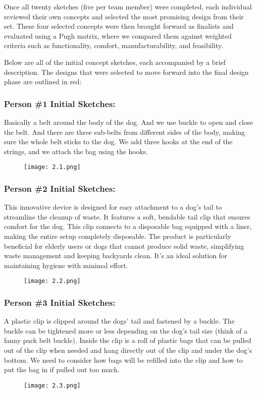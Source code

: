\documentclass[12pt]{article}
\theoremstyle{definition} %
\theoremstyle{plain} %
\begin{document}
Once all twenty sketches (five per team member) were completed, each
individual reviewed their own concepts and selected the most promising design from
their set. These four selected concepts were then brought forward as finalists and
evaluated using a Pugh matrix, where we compared them against weighted criteria
such as functionality, comfort, manufacturability, and feasibility.

Below are all of the initial concept sketches, each accompanied by a brief
description. The designs that were selected to move forward into the final
design phase are outlined in red:
\pagebreak
\subsubsection*{Person \#1 Initial Sketches:}
Basically a belt around the body of the dog. And we
use buckle to open and close the belt. And there are three sub-belts from different
sides of the body, making sure the whole belt sticks to the dog. We add three hooks
at the end of the strings, and we attach the bag using the hooks.
\begin{figure}[htbp]
  \centering
  \texttt{[image: 2.1.png]}
  \caption{}
  \label{fig:}
\end{figure}
\subsubsection*{Person \#2 Initial Sketches:}
This innovative device is designed for easy attachment
to a dog's tail to streamline the cleanup of waste. It features a soft, bendable tail clip
that ensures comfort for the dog. This clip connects to a disposable bag equipped
with a liner, making the entire setup completely disposable. The product is
particularly beneficial for elderly users or dogs that cannot produce solid waste,
simplifying waste management and keeping backyards clean. It's an ideal solution
for maintaining hygiene with minimal effort.
\begin{figure}[htbp]
  \centering
  \texttt{[image: 2.2.png]}
  \caption{}
  \label{fig:}
\end{figure}
\pagebreak
\subsubsection*{Person \#3 Initial Sketches:}
A plastic clip is clipped around the dogs' tail and
fastened by a buckle. The buckle can be tightened more or less depending on the
dog's tail size (think of a fanny pack belt buckle). Inside the clip is a roll of plastic
bags that can be pulled out of the clip when needed and hang directly out of the clip
and under the dog's bottom. We need to consider how bags will be refilled into the
clip and how to put the bag in if pulled out too much.
\begin{figure}[htbp]
  \centering
  \texttt{[image: 2.3.png]}
  \caption{}
  \label{fig:}
\end{figure}
\end{document}
